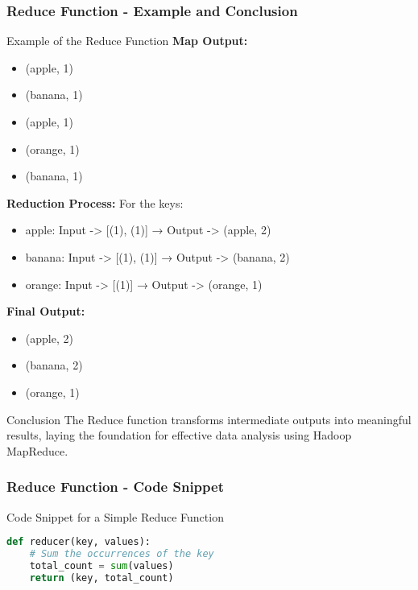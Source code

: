 \documentclass[aspectratio=169]{beamer}
\begin{document}
\begin{frame}[fragile]
    \frametitle{Reduce Function - Example and Conclusion}
    \begin{block}{Example of the Reduce Function}
        \textbf{Map Output:}
        \begin{itemize}
            \item (apple, 1)
            \item (banana, 1)
            \item (apple, 1)
            \item (orange, 1)
            \item (banana, 1)
        \end{itemize}
        
        \textbf{Reduction Process:}
        For the keys:
        \begin{itemize}
            \item apple: Input -> [(1), (1)] → Output -> (apple, 2)
            \item banana: Input -> [(1), (1)] → Output -> (banana, 2)
            \item orange: Input -> [(1)] → Output -> (orange, 1)
        \end{itemize}
        
        \textbf{Final Output:}
        \begin{itemize}
            \item (apple, 2)
            \item (banana, 2)
            \item (orange, 1)
        \end{itemize}
    \end{block}
    
    \begin{block}{Conclusion}
        The Reduce function transforms intermediate outputs into meaningful results, laying the foundation for effective data analysis using Hadoop MapReduce.
    \end{block}
\end{frame}

\begin{frame}[fragile]
    \frametitle{Reduce Function - Code Snippet}
    \begin{block}{Code Snippet for a Simple Reduce Function}
        \begin{lstlisting}[language=Python]
def reducer(key, values):
    # Sum the occurrences of the key
    total_count = sum(values)
    return (key, total_count)
        \end{lstlisting}
    \end{block}
\end{frame}
\end{document}
